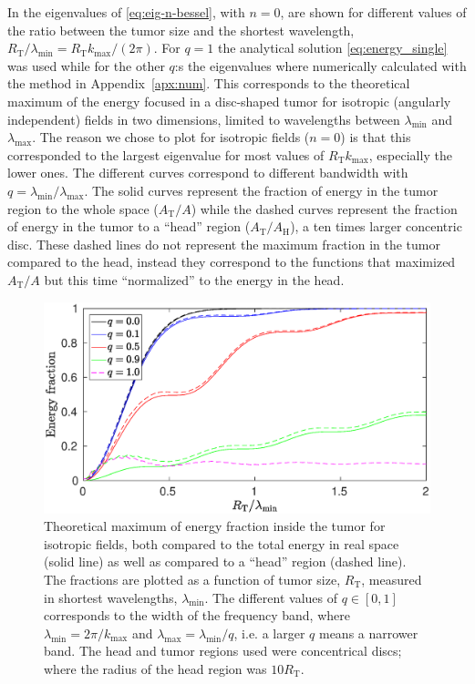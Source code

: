 \documentclass[11pt,a4paper, 
swedish,english %
]{article}
\newcommand{\RT}{\ensuremath{R_{\text{T}}}}
\begin{document}
In  the eigenvalues of \eqref{eq:eig-n-bessel}, with $n=0$, are shown 
for different values of the ratio between the tumor size and the
shortest wavelength, $\RT/\lambda_{\min}=\RT{k_{\max}}/(2\pi)$. For
$q=1$ the analytical solution \eqref{eq:energy_single} was used while
for the other $q$:s the eigenvalues where numerically calculated with
the method in Appendix~\ref{apx:num}. 
This corresponds to the theoretical maximum of the energy focused in a
disc-shaped tumor for isotropic (angularly independent) fields in two
dimensions, limited to wavelengths between $\lambda_{\min}$ and
$\lambda_{\max}$. 
The reason we chose to plot for isotropic fields ($n=0$) is that this
corresponded to the largest eigenvalue for most values of $\RT
k_{\max}$, especially the lower ones. 
The different curves correspond to different bandwidth with
$q=\lambda_{\min}/\lambda_{\max}$. The solid curves represent the
fraction of energy in the tumor region to the whole space
($A_\text{T}/A$) while the dashed curves represent the fraction of
energy in the tumor to a ``head'' region ($A_\text{T}/A_\text{H}$), a
ten times larger concentric disc. These dashed lines do not represent
the maximum fraction in the tumor compared to the head, instead they
correspond to the functions that maximized $A_\text{T}/A$ but this
time ``normalized''  to the energy in the head. 

\begin{figure}
\begin{center}
\centerline{ %
\includegraphics[width=15cm]{ring_both_L1000.eps}
}
\caption{Theoretical maximum of energy fraction inside the tumor for
  isotropic fields, both compared to the total energy in real space
  (solid line) as well as compared to a ``head'' region (dashed
  line). The fractions are plotted as a function of tumor size, $\RT$,
  measured in shortest wavelengths, $\lambda_{\min}$. The different
  values of $q\in[0, 1]$ corresponds to the width of the frequency
  band, where $\lambda_{\min}=2\pi/k_{\max}$ and
  $\lambda_{\max}=\lambda_{\min}/q$, i.e. a larger $q$ means a
  narrower band. The head and tumor regions used were concentrical
  discs; where the radius of the head region was $10\RT$. } 
\label{fig:both}
\end{center}
\end{figure}
\end{document}
